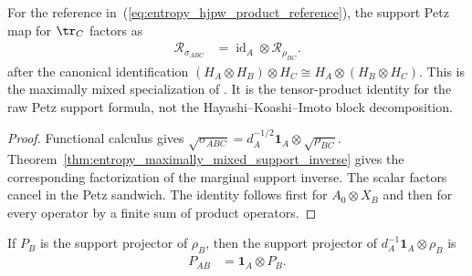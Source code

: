 \begin{theorem}
    \label{thm:entropy_petz_maximally_mixed_tensor}
    \leanok
    For the reference in~(\ref{eq:entropy_hjpw_product_reference}), the support
    Petz map for $\tr_C$ factors as
    \begin{align}
        \mathcal R_{\sigma_{ABC}}
        &=\operatorname{id}_A\otimes\mathcal R_{\rho_{BC}}.
        \label{eq:entropy_hjpw_petz_factorization}
    \end{align}
    after the canonical identification
    $(H_A\otimes H_B)\otimes H_C\cong
    H_A\otimes(H_B\otimes H_C)$. This is the maximally mixed specialization
    of \cite[equation~(10)]{Hayden2004Structure}. It is the tensor-product
    identity for the raw Petz support formula, not the
    Hayashi--Koashi--Imoto block decomposition.
\end{theorem}

\begin{proof}\leanok
    Functional calculus gives
    $\sqrt{\sigma_{ABC}}
      =d_A^{-1/2}\mathbf 1_A\otimes\sqrt{\rho_{BC}}$.
    Theorem~\ref{thm:entropy_maximally_mixed_support_inverse} gives the
    corresponding factorization of the marginal support inverse.
    The scalar factors cancel in the Petz sandwich. The identity follows first
    for $A_0\otimes X_B$ and then for every operator by a finite sum of product
    operators.
\end{proof}

\begin{theorem}
    \label{thm:entropy_maximally_mixed_support_projector}
    \leanok
    If $P_B$ is the support projector of $\rho_B$, then the support projector of
    $d_A^{-1}\mathbf 1_A\otimes\rho_B$ is
    \begin{align}
        P_{AB}
        &=\mathbf 1_A\otimes P_B.
        \label{eq:entropy_mixed_reference_support}
    \end{align}
\end{theorem}

